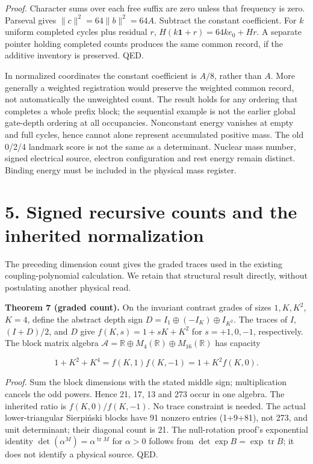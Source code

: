 \documentclass[
  11pt,
]{article}
\begin{document}
\emph{Proof.} Character sums over each free suffix are zero unless that
frequency is zero. Parseval gives \(\|c\|^2=64\|b\|^2=64A\). Subtract
the constant coefficient. For \(k\) uniform completed cycles plus
residual \(r\), \(H(k\mathbf1+r)=64k e_0+Hr\). A separate pointer
holding completed counts produces the same common record, if the
additive inventory is preserved. QED.

In normalized coordinates the constant coefficient is \(A/8\), rather
than \(A\). More generally a weighted registration would preserve the
weighted common record, not automatically the unweighted count. The
result holds for any ordering that completes a whole prefix block; the
sequential example is not the earlier global gate-depth ordering at all
occupancies. Nonconstant energy vanishes at empty and full cycles, hence
cannot alone represent accumulated positive mass. The old 0/2/4 landmark
score is not the same as a determinant. Nuclear mass number, signed
electrical source, electron configuration and rest energy remain
distinct. Binding energy must be included in the physical mass register.

\section{5. Signed recursive counts and the inherited
normalization}\label{signed-recursive-counts-and-the-inherited-normalization}

The preceding dimension count gives the graded traces used in the
existing coupling-polynomial calculation. We retain that structural
result directly, without postulating another physical read.

\textbf{Theorem 7 (graded count).} On the invariant contrast grades of
sizes \(1,K,K^2\), \(K=4\), define the abstract depth sign
\(D=I_1\oplus(-I_K)\oplus I_{K^2}\). The traces of \(I\), \((I+D)/2\),
and \(D\) give \(f(K,s)=1+sK+K^2\) for \(s=+1,0,-1\), respectively. The
block matrix algebra
\(\mathcal A=\mathbb R\oplus M_4(\mathbb R)\oplus M_{16}(\mathbb R)\)
has capacity

\[1+K^2+K^4=f(K,1)f(K,-1)=1+K^2 f(K,0).\]

\emph{Proof.} Sum the block dimensions with the stated middle sign;
multiplication cancels the odd powers. Hence 21, 17, 13 and 273 occur in
one algebra. The inherited ratio is \(f(K,0)/f(K,-1)\). No trace
constraint is needed. The actual lower-triangular Sierpiński blocks have
91 nonzero entries (1+9+81), not 273, and unit determinant; their
diagonal count is 21. The null-rotation proof's exponential identity
\(\det(\alpha^M)=\alpha^{\operatorname{tr}M}\) for \(\alpha>0\) follows
from \(\det\exp B=\exp\operatorname{tr}B\); it does not identify a
physical source. QED.
\end{document}
